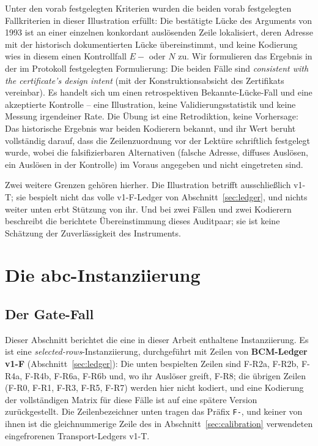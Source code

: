 \documentclass[11pt,a4paper]{article}
\begin{document}
Unter den vorab festgelegten Kriterien wurden die beiden vorab festgelegten
Fallkriterien in dieser Illustration erfüllt: Die bestätigte Lücke des
Arguments von 1993 ist an einer einzelnen konkordant auslösenden Zeile
lokalisiert, deren Adresse mit der historisch dokumentierten Lücke
übereinstimmt, und keine Kodierung wies in diesem einen Kontrollfall $E{-}$
oder $N$ zu. Wir formulieren das Ergebnis in der im Protokoll festgelegten
Formulierung: Die beiden Fälle sind \emph{consistent with the certificate's
design intent} (mit der Konstruktionsabsicht des Zertifikats vereinbar). Es
handelt sich um einen retrospektiven Bekannte-Lücke-Fall und eine akzeptierte
Kontrolle -- eine Illustration, keine Validierungsstatistik und keine
Messung irgendeiner Rate. Die Übung ist eine Retrodiktion, keine Vorhersage:
Das historische Ergebnis war beiden Kodierern bekannt, und ihr Wert beruht
vollständig darauf, dass die Zeilenzuordnung vor der Lektüre schriftlich
festgelegt wurde, wobei die falsifizierbaren Alternativen (falsche Adresse,
diffuses Auslösen, ein Auslösen in der Kontrolle) im Voraus angegeben und
nicht eingetreten sind.

Zwei weitere Grenzen gehören hierher. Die Illustration betrifft
ausschließlich v1-T; sie bespielt nicht das volle v1-F-Ledger von
Abschnitt~\ref{sec:ledger}, und nichts weiter unten erbt Stützung von ihr.
Und bei zwei Fällen und zwei Kodierern beschreibt die berichtete
Übereinstimmung dieses Auditpaar; sie ist keine Schätzung der
Zuverlässigkeit des Instruments.

\section{Die abc-Instanziierung}\label{sec:abc}

\subsection{Der Gate-Fall}\label{sec:abc-gate}

Dieser Abschnitt berichtet die eine in dieser Arbeit enthaltene
Instanziierung. Es ist eine \emph{selected-rows}-Instanziierung, durchgeführt
mit Zeilen von \textbf{BCM-Ledger v1-F} (Abschnitt~\ref{sec:ledger}): Die
unten bespielten Zeilen sind F-R2a, F-R2b, F-R4a, F-R4b, F-R6a, F-R6b und,
wo ihr Auslöser greift, F-R8; die übrigen Zeilen (F-R0, F-R1, F-R3, F-R5,
F-R7) werden hier nicht kodiert, und eine Kodierung der vollständigen Matrix
für diese Fälle ist auf eine spätere Version zurückgestellt. Die
Zeilenbezeichner unten tragen das Präfix \texttt{F-}, und keiner von ihnen
ist die gleichnummerige Zeile des in Abschnitt~\ref{sec:calibration}
verwendeten eingefrorenen Transport-Ledgers v1-T.
\end{document}
